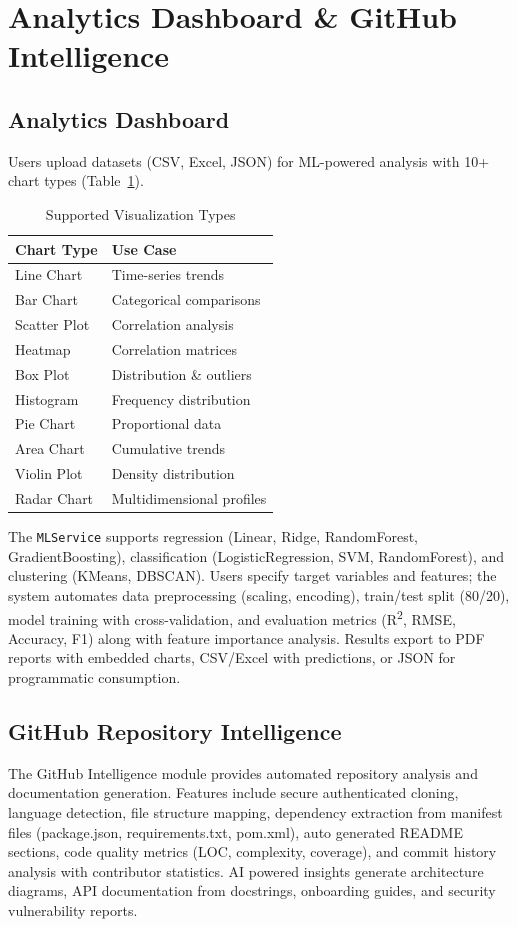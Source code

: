 \documentclass[conference]{IEEEtran}
\begin{document}
\section{Analytics Dashboard \& GitHub Intelligence}

\subsection{Analytics Dashboard}
Users upload datasets (CSV, Excel, JSON) for ML-powered analysis with 10+ chart types (Table~\ref{tab:charts}).

\begin{table}[htbp]
\caption{Supported Visualization Types}
\begin{center}
\begin{tabularx}{\linewidth}{|l|X|}
\hline
\textbf{Chart Type} & \textbf{Use Case} \\
\hline
Line Chart & Time-series trends \\
Bar Chart & Categorical comparisons \\
Scatter Plot & Correlation analysis \\
Heatmap & Correlation matrices \\
Box Plot & Distribution \& outliers \\
Histogram & Frequency distribution \\
Pie Chart & Proportional data \\
Area Chart & Cumulative trends \\
Violin Plot & Density distribution \\
Radar Chart & Multidimensional profiles \\
\hline
\end{tabularx}
\label{tab:charts}
\end{center}
\end{table}

The \texttt{MLService} supports regression (Linear, Ridge, RandomForest, GradientBoosting), classification (LogisticRegression, SVM, RandomForest), and clustering (KMeans, DBSCAN). Users specify target variables and features; the system automates data preprocessing (scaling, encoding), train/test split (80/20), model training with cross-validation, and evaluation metrics (R\textsuperscript{2}, RMSE, Accuracy, F1) along with feature importance analysis. Results export to PDF reports with embedded charts, CSV/Excel with predictions, or JSON for programmatic consumption.

\subsection{GitHub Repository Intelligence}
The GitHub Intelligence module provides automated repository analysis and documentation generation. Features include secure authenticated cloning, language detection, file structure mapping, dependency extraction from manifest files (package.json, requirements.txt, pom.xml), auto generated README sections, code quality metrics (LOC, complexity, coverage), and commit history analysis with contributor statistics. AI powered insights generate architecture diagrams, API documentation from docstrings, onboarding guides, and security vulnerability reports.
\end{document}
